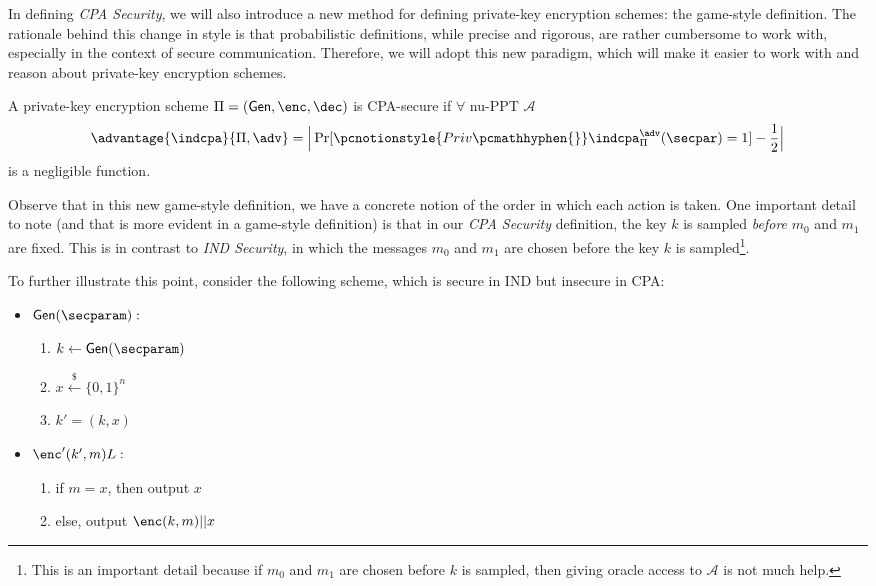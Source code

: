 \documentclass[12pt]{tufte-book}
\newcommand{\ma}{\mathcal{A}}
\newcommand{\getsr}{\xleftarrow{\$}}
\newcommand{\gen}{\mathsf{Gen}}
\begin{document}

In defining \textit{CPA Security}, we will also introduce a new method for defining private-key encryption schemes: the game-style definition.
The rationale behind this change in style is that probabilistic definitions, while precise and rigorous, are rather cumbersome to work with, especially in the context of secure communication.
Therefore, we will adopt this new paradigm, which will make it easier to work with and reason about private-key encryption schemes.

\marginnote[-1.5in]{
\procedureblock[linenumbering]{$ \pcnotionstyle{Priv\pcmathhyphen{}}\indcpa_{\Pi}^{\adv}(\secpar)$}{
 b \getsr \bin \\
  \key  \getsr \gen ( \secparam ) \\
 ( \state ,m_0 ,m_1) \getsr \adv^{\enc ( \key ,\cdot )} ( \secparam) \\
 c \getsr \enc ( \key ,m_b ) \\
 b' \getsr \adv^{\enc ( \key ,\cdot )} ( \state , c ) \\
 \pcreturn b = b' \land |m_0| = |m_1| = l(n)
 }}

\begin{definition}
    A private-key encryption scheme $\Pi = (\gen,\enc,\dec)$ is CPA-secure if $\forall$ nu-PPT $\ma$
    $$\advantage{\indcpa}{\Pi,\adv} = \Big| \Pr[\pcnotionstyle{Priv\pcmathhyphen{}}\indcpa_\Pi^\adv(\secpar) =1] -\frac{1}{2}\Big|$$
    is a negligible function.
\end{definition}
Observe that in this new game-style definition, we have a concrete notion of the order in which each action is taken.
One important detail to note (and that is more evident in a game-style definition) is that in our \textit{CPA Security} definition,
the key $k$ is sampled \textit{before} $m_0$ and $m_1$ are fixed.
This is in contrast to \textit{IND Security}, in which the messages $m_0$ and $m_1$ are chosen before the key $k$ is sampled\footnote{This is an important detail because if $m_0$ and $m_1$ are chosen before $k$ is sampled, then giving oracle access to $\ma$ is not much help.}.

To further illustrate this point, consider the following scheme, which is secure in IND but insecure in CPA:
\begin{itemize}
    \item $\gen(\secparam):$
    \begin{enumerate}
        \item $k \leftarrow \gen(\secparam)$
        \item $x \getsr \{0, 1\}^n$
        \item $k' = (k, x)$
    \end{enumerate}
    \item $\enc'(k', m)L:$
    \begin{enumerate}
        \item if $m = x$, then output $x$
        \item else, output $\enc(k,m)||x$
    \end{enumerate}
\end{itemize}
\end{document}
